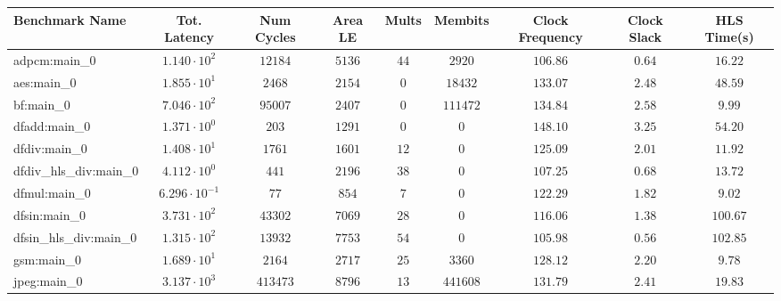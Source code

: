\begin{tabular}{|l|c|c|c|c|c|c|c|c|}
\hline
Benchmark Name          & Tot. Latency            & Num Cycles & Area LE   & Mults   & Membits    & Clock Frequency & Clock Slack & HLS Time(s) \\
\hline
adpcm:main\_0           & $ 1.140 \cdot 10^{2}  $ & $ 12184  $ & $ 5136  $ & $ 44  $ & $ 2920   $ & $ 106.86      $ & $ 0.64    $ & $ 16.22   $ \\
aes:main\_0             & $ 1.855 \cdot 10^{1}  $ & $ 2468   $ & $ 2154  $ & $ 0   $ & $ 18432  $ & $ 133.07      $ & $ 2.48    $ & $ 48.59   $ \\
bf:main\_0              & $ 7.046 \cdot 10^{2}  $ & $ 95007  $ & $ 2407  $ & $ 0   $ & $ 111472 $ & $ 134.84      $ & $ 2.58    $ & $ 9.99    $ \\
dfadd:main\_0           & $ 1.371 \cdot 10^{0}  $ & $ 203    $ & $ 1291  $ & $ 0   $ & $ 0      $ & $ 148.10      $ & $ 3.25    $ & $ 54.20   $ \\
dfdiv:main\_0           & $ 1.408 \cdot 10^{1}  $ & $ 1761   $ & $ 1601  $ & $ 12  $ & $ 0      $ & $ 125.09      $ & $ 2.01    $ & $ 11.92   $ \\
dfdiv\_hls\_div:main\_0 & $ 4.112 \cdot 10^{0}  $ & $ 441    $ & $ 2196  $ & $ 38  $ & $ 0      $ & $ 107.25      $ & $ 0.68    $ & $ 13.72   $ \\
dfmul:main\_0           & $ 6.296 \cdot 10^{-1} $ & $ 77     $ & $ 854   $ & $ 7   $ & $ 0      $ & $ 122.29      $ & $ 1.82    $ & $ 9.02    $ \\
dfsin:main\_0           & $ 3.731 \cdot 10^{2}  $ & $ 43302  $ & $ 7069  $ & $ 28  $ & $ 0      $ & $ 116.06      $ & $ 1.38    $ & $ 100.67  $ \\
dfsin\_hls\_div:main\_0 & $ 1.315 \cdot 10^{2}  $ & $ 13932  $ & $ 7753  $ & $ 54  $ & $ 0      $ & $ 105.98      $ & $ 0.56    $ & $ 102.85  $ \\
gsm:main\_0             & $ 1.689 \cdot 10^{1}  $ & $ 2164   $ & $ 2717  $ & $ 25  $ & $ 3360   $ & $ 128.12      $ & $ 2.20    $ & $ 9.78    $ \\
jpeg:main\_0            & $ 3.137 \cdot 10^{3}  $ & $ 413473 $ & $ 8796  $ & $ 13  $ & $ 441608 $ & $ 131.79      $ & $ 2.41    $ & $ 19.83   $ \\

\end{tabular}
